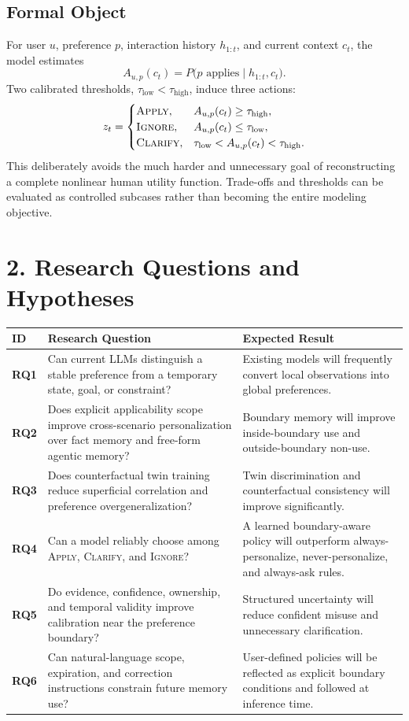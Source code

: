 \documentclass[10.5pt,a4paper]{article}
\begin{document}
\subsection{Formal Object}
For user $u$, preference $p$, interaction history $h_{1:t}$, and current context $c_t$, the model estimates
\[
A_{u,p}(c_t)=P\bigl(p\text{ applies}\mid h_{1:t},c_t\bigr).
\]
Two calibrated thresholds, $\tau_{\mathrm{low}}<\tau_{\mathrm{high}}$, induce three actions:
\[
z_t=
\begin{cases}
\textsc{Apply}, & A_{u,p}(c_t)\ge \tau_{\mathrm{high}},\\
\textsc{Ignore}, & A_{u,p}(c_t)\le \tau_{\mathrm{low}},\\
\textsc{Clarify}, & \tau_{\mathrm{low}}<A_{u,p}(c_t)<\tau_{\mathrm{high}}.
\end{cases}
\]
This deliberately avoids the much harder and unnecessary goal of reconstructing a complete nonlinear human utility function. Trade-offs and thresholds can be evaluated as controlled subcases rather than becoming the entire modeling objective.

\section{2. Research Questions and Hypotheses}

\begin{tabularx}{\textwidth}{P{1.05cm}Y P{4.25cm}}
\toprule
{}
\textbf{ID} & \textbf{Research Question} & \textbf{Expected Result}\\
\midrule
\textbf{RQ1} & Can current LLMs distinguish a stable preference from a temporary state, goal, or constraint? & Existing models will frequently convert local observations into global preferences.\\
\textbf{RQ2} & Does explicit applicability scope improve cross-scenario personalization over fact memory and free-form agentic memory? & Boundary memory will improve inside-boundary use and outside-boundary non-use.\\
\textbf{RQ3} & Does counterfactual twin training reduce superficial correlation and preference overgeneralization? & Twin discrimination and counterfactual consistency will improve significantly.\\
\textbf{RQ4} & Can a model reliably choose among \textsc{Apply}, \textsc{Clarify}, and \textsc{Ignore}? & A learned boundary-aware policy will outperform always-personalize, never-personalize, and always-ask rules.\\
\textbf{RQ5} & Do evidence, confidence, ownership, and temporal validity improve calibration near the preference boundary? & Structured uncertainty will reduce confident misuse and unnecessary clarification.\\
\textbf{RQ6} & Can natural-language scope, expiration, and correction instructions constrain future memory use? & User-defined policies will be reflected as explicit boundary conditions and followed at inference time.\\
\bottomrule
\end{tabularx}
\end{document}
